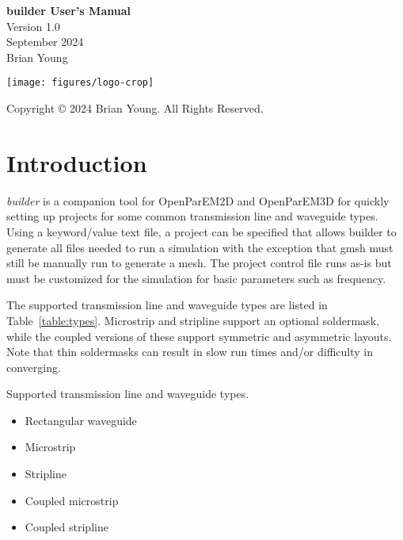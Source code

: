 \documentclass[titlepage]{article}
\renewcommand\_{\textunderscore\linebreak[1]}
\begin{document}
\begin{titlepage}

   \centering
   \vspace*{3cm}
   {\huge\bfseries builder User's Manual} \\
   \vskip1cm
   {\Large Version 1.0} \\
   \vskip1cm
   {\Large September 2024} \\
   \vskip1cm
   {\Large Brian Young} \\

   \vfill

   \texttt{[image: figures/logo-crop]}

   \vspace*{\fill}
   Copyright \copyright{} 2024 Brian Young. All Rights Reserved.
\end{titlepage}

\tableofcontents

\newpage
\section{Introduction}

\textit{builder} is a companion tool for OpenParEM2D and OpenParEM3D for quickly setting up projects for some common transmission line and waveguide types.  Using a keyword/value text file, a project can be specified that allows builder to generate all files needed to run a simulation with the exception that gmsh \cite{gmsh}\cite{gmshweb} must still be manually run to generate a mesh.  The project control file runs as-is but must be customized for the simulation for basic parameters such as frequency.

The supported transmission line and waveguide types are listed in Table~\ref{table:types}.  Microstrip and stripline support an optional soldermask, while the coupled versions of these support symmetric and asymmetric layouts.  Note that thin soldermasks can result in slow run times and/or difficulty in converging.

\begin{table}[ht]
\caption{Supported transmission line and waveguide types.}
\noindent \hrulefill
\begin{itemize}[nosep]
  \item Rectangular waveguide
  \item Microstrip
  \item Stripline
  \item Coupled microstrip
  \item Coupled stripline
\end{itemize}
\noindent \hrulefill
\label{table:types}
\end{table}
\end{document}
